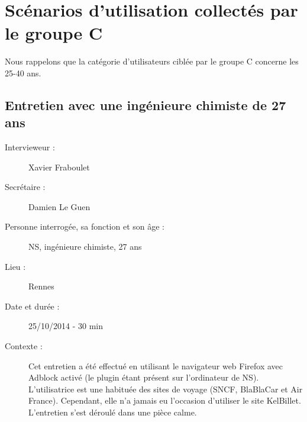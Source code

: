 
\newcommand\guy[1]{\og #1\fg}
\newcommand\kel{KelBillet}


\section{Sc\'{e}narios d'utilisation collect\'{e}s par le groupe C}
\label{groupeC:utilisation}
Nous rappelons que la cat\'{e}gorie d'utilisateurs cibl\'{e}e par le groupe C
concerne les 25-40 ans.





\subsection{Entretien avec une ing\'{e}nieure chimiste de 27 ans}

\begin{description}
\item [Intervieweur :] Xavier Fraboulet
\item [Secr\'{e}taire :] Damien Le Guen
\item [Personne interrog\'{e}e, sa fonction et son \^{a}ge :] NS, ing\'{e}nieure chimiste, 27 ans
\item [Lieu :] Rennes
\item [Date et dur\'{e}e :] 25/10/2014 - 30 min
\item [Contexte :] Cet entretien a \'{e}t\'{e} effectu\'{e} en utilisant le navigateur web Firefox avec Adblock activ\'{e} (le plugin \'{e}tant pr\'{e}sent sur l'ordinateur de NS). L'utilisatrice est une habitu\'{e}e des sites de voyage (SNCF, BlaBlaCar et Air France). Cependant, elle n'a jamais eu l'occasion d'utiliser le site \kel. L'entretien s'est d\'{e}roul\'{e} dans une pi\`{e}ce calme. 
\end{description}


